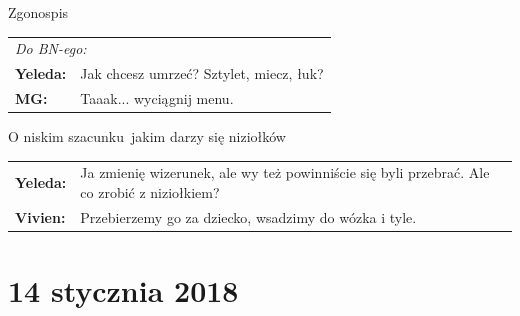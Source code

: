 \documentclass[10pt,twoside,twocolumn]{book}
\begin{document}
\begin{rpg-quotebox}{Zgonospis}
   \begin{tabularx}{\columnwidth}{lX}
      \multicolumn{2}{l}{\textit{Do BN-ego:}}\\
      \textbf{Yeleda:} & Jak chcesz umrzeć? Sztylet, miecz, łuk?\\
      \textbf{MG:} & Taaak... wyciągnij menu.\\
   \end{tabularx}
\end{rpg-quotebox}

\begin{rpg-quotebox}{O niskim szacunku\, jakim darzy się niziołków}
   \begin{tabularx}{\columnwidth}{lX}
      \textbf{Yeleda:} & Ja zmienię wizerunek, ale wy też powinniście się byli przebrać. Ale co zrobić z niziołkiem?\\
      \textbf{Vivien:} & Przebierzemy go za dziecko, wsadzimy do wózka i tyle.\\
   \end{tabularx}
\end{rpg-quotebox}

\section*{14 stycznia 2018}
\end{document}
